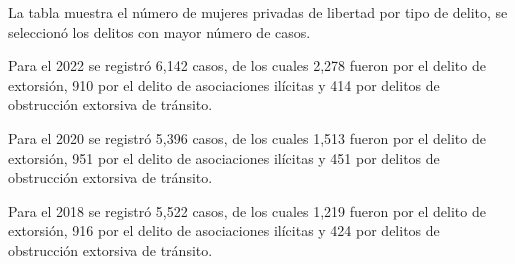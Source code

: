 La tabla muestra el número de mujeres privadas de libertad por tipo de delito, se seleccionó los delitos con mayor número de casos. 

Para el 2022 se registró 6,142 casos, de los cuales 2,278 fueron por el delito de extorsión, 910 por el delito de asociaciones ilícitas y 414 por delitos de obstrucción extorsiva de tránsito.

Para el 2020 se registró 5,396 casos, de los cuales 1,513 fueron por el delito de extorsión, 951 por el delito de asociaciones ilícitas y 451 por delitos de obstrucción extorsiva de tránsito.

Para el 2018 se registró 5,522 casos, de los cuales 1,219 fueron por el delito de extorsión, 916 por el delito de asociaciones ilícitas y 424 por delitos de obstrucción extorsiva de tránsito.
